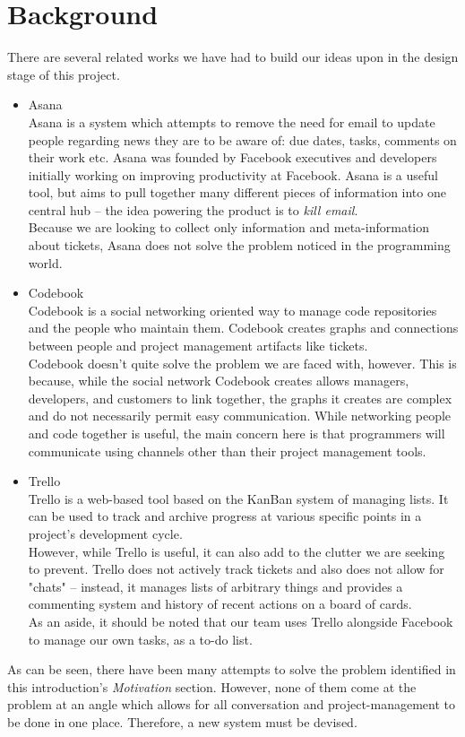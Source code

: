 \documentclass[draft, 10pt]{article}
\begin{document}
\section{Background}
There are several related works we have had to build our ideas upon in the design stage of this project. 
\begin{itemize}
\item Asana\\
Asana is a system which attempts to remove the need for email to update people regarding news they are to be aware of: due dates, tasks, comments on their work etc. Asana was founded by Facebook executives and developers initially working on improving productivity at Facebook. Asana is a useful tool, but aims to pull together many different pieces of information into one central hub -- the idea powering the product is to \emph{kill email}. \\
Because we are looking to collect only information and meta-information about tickets, Asana does not solve the problem noticed in the programming world. 
\item Codebook \\
Codebook is a social networking oriented way to manage code repositories and the people who maintain them. Codebook creates graphs and connections between people and project management artifacts like tickets.\\
Codebook doesn't quite solve the problem we are faced with, however. This is because, while the social network Codebook creates allows managers, developers, and customers to link together, the graphs it creates are complex and do not necessarily permit easy communication. While networking people and code together is useful, the main concern here is that programmers will communicate using channels other than their project management tools. 
\item Trello \\
Trello is a web-based tool based on the KanBan system of managing lists. It can be used to track and archive progress at various specific points in a project's development cycle. \\
However, while Trello is useful, it can also add to the clutter we are seeking to prevent. Trello does not actively track tickets and also does not allow for "chats" -- instead, it manages lists of arbitrary things and provides a commenting system and history of recent actions on a board of cards. \\
As an aside, it should be noted that our team uses Trello alongside Facebook to manage our own tasks, as a to-do list. 
\end{itemize}
\par As can be seen, there have been many attempts to solve the problem identified in this introduction's \emph{Motivation} section. However, none of them come at the problem at an angle which allows for all conversation and project-management to be done in one place. Therefore, a new system must be devised. 
\end{document}

